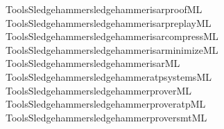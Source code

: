 \begin{isabellebody}
\isamarkupfalse%
\ {\isacartoucheopen}Tools{\isacharslash}{\kern0pt}Sledgehammer{\isacharslash}{\kern0pt}sledgehammer{\isacharunderscore}{\kern0pt}isar{\isacharunderscore}{\kern0pt}proof{\isachardot}{\kern0pt}ML{\isacartoucheclose}\isanewline
{}\isamarkupfalse%
\ {\isacartoucheopen}Tools{\isacharslash}{\kern0pt}Sledgehammer{\isacharslash}{\kern0pt}sledgehammer{\isacharunderscore}{\kern0pt}isar{\isacharunderscore}{\kern0pt}preplay{\isachardot}{\kern0pt}ML{\isacartoucheclose}\isanewline
{}\isamarkupfalse%
\ {\isacartoucheopen}Tools{\isacharslash}{\kern0pt}Sledgehammer{\isacharslash}{\kern0pt}sledgehammer{\isacharunderscore}{\kern0pt}isar{\isacharunderscore}{\kern0pt}compress{\isachardot}{\kern0pt}ML{\isacartoucheclose}\isanewline
{}\isamarkupfalse%
\ {\isacartoucheopen}Tools{\isacharslash}{\kern0pt}Sledgehammer{\isacharslash}{\kern0pt}sledgehammer{\isacharunderscore}{\kern0pt}isar{\isacharunderscore}{\kern0pt}minimize{\isachardot}{\kern0pt}ML{\isacartoucheclose}\isanewline
{}\isamarkupfalse%
\ {\isacartoucheopen}Tools{\isacharslash}{\kern0pt}Sledgehammer{\isacharslash}{\kern0pt}sledgehammer{\isacharunderscore}{\kern0pt}isar{\isachardot}{\kern0pt}ML{\isacartoucheclose}\isanewline
{}\isamarkupfalse%
\ {\isacartoucheopen}Tools{\isacharslash}{\kern0pt}Sledgehammer{\isacharslash}{\kern0pt}sledgehammer{\isacharunderscore}{\kern0pt}atp{\isacharunderscore}{\kern0pt}systems{\isachardot}{\kern0pt}ML{\isacartoucheclose}\isanewline
{}\isamarkupfalse%
\ {\isacartoucheopen}Tools{\isacharslash}{\kern0pt}Sledgehammer{\isacharslash}{\kern0pt}sledgehammer{\isacharunderscore}{\kern0pt}prover{\isachardot}{\kern0pt}ML{\isacartoucheclose}\isanewline
{}\isamarkupfalse%
\ {\isacartoucheopen}Tools{\isacharslash}{\kern0pt}Sledgehammer{\isacharslash}{\kern0pt}sledgehammer{\isacharunderscore}{\kern0pt}prover{\isacharunderscore}{\kern0pt}atp{\isachardot}{\kern0pt}ML{\isacartoucheclose}\isanewline
{}\isamarkupfalse%
\ {\isacartoucheopen}Tools{\isacharslash}{\kern0pt}Sledgehammer{\isacharslash}{\kern0pt}sledgehammer{\isacharunderscore}{\kern0pt}prover{\isacharunderscore}{\kern0pt}smt{\isachardot}{\kern0pt}ML{\isacartoucheclose}\isanewline
{}\isamarkupfalse%

\end{isabellebody}
